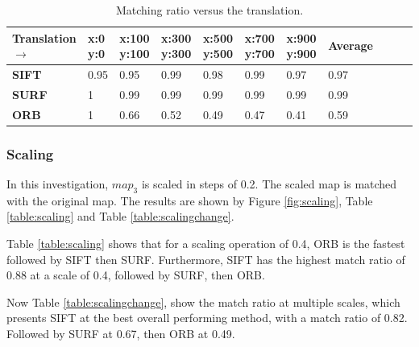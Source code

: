 \begin{table}[H]
\centering
\caption{Matching ratio versus the translation.}
\begin{tabular}{ | m{5.5em} | m{1cm} | m{1cm} | m{1cm} | m{1cm} | m{1cm} | m{1cm} || m{1.5cm} | m{1cm} | m{1cm} | m{1cm} | } 
\hline
\textbf{Translation $\rightarrow$} & \textbf{x:0 y:0} & \textbf{x:100 y:100}  & \textbf{x:300 y:300}  & \textbf{x:500 y:500} & \textbf{x:700 y:700} & \textbf{x:900 y:900} & \textbf{Average}   \\ 
\hline
\textbf{SIFT}  & 0.95 & 0.95 & 0.99 & 0.98 & 0.99 & 0.97 & 0.97 \\ 
\hline
\textbf{SURF}  & 1 & 0.99 & 0.99 & 0.99 & 0.99 & 0.99 & 0.99 \\ 
\hline
\textbf{ORB}  & 1 & 0.66 & 0.52 & 0.49 & 0.47 & 0.41 & 0.59 \\ 
\hline
\hline
\end{tabular}
\label{table:translationchange}
\end{table}


\subsubsection{Scaling}

In this investigation, $map_3$ is scaled in steps of 0.2. The scaled map is matched with the original map. The results are shown by Figure \ref{fig:scaling}, Table \ref{table:scaling} and Table \ref{table:scalingchange}. 

Table \ref{table:scaling} shows that for a scaling operation of 0.4, ORB is the fastest followed by SIFT then SURF. Furthermore, SIFT has the highest match ratio of 0.88 at a scale of 0.4, followed by SURF, then ORB.

Now Table \ref{table:scalingchange}, show the match ratio at multiple scales, which presents SIFT at the best overall performing method, with a match ratio of 0.82. Followed by SURF at 0.67, then ORB at 0.49.


